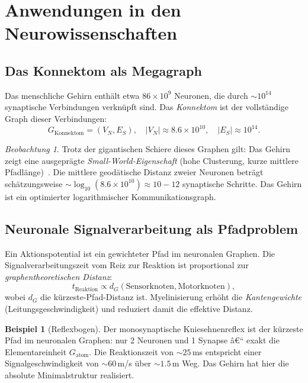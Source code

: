 ﻿\documentclass[12pt,a4paper,twoside]{article}
\theoremstyle{definition}
\newtheorem{beispiel}{Beispiel}[section]
\theoremstyle{plain}
\theoremstyle{remark}
\newtheorem{beobachtung}{Beobachtung}[section]
\begin{document}
\section{Anwendungen in den Neurowissenschaften}
\label{sec:neuro}

\subsection{Das Konnektom als Megagraph}

Das menschliche Gehirn enthält etwa $86 \times 10^9$ Neuronen,
die durch $\sim 10^{14}$ synaptische Verbindungen verknüpft
sind.  Das \emph{Konnektom} ist der vollständige Graph dieser
Verbindungen:
\[
  G_{\text{Konnektom}} = (V_N, E_S), \quad
  |V_N| \approx 8.6 \times 10^{10}, \quad
  |E_S| \approx 10^{14}.
\]

\begin{beobachtung}
Trotz der gigantischen Schiere dieses Graphen gilt:  Das Gehirn
zeigt eine ausgeprägte \emph{Small-World-Eigenschaft}
(hohe Clusterung, kurze mittlere Pfadlänge)~\cite{Watts1998}.
Die mittlere geodätische Distanz zweier Neuronen beträgt
schätzungsweise $\sim \log_{10}(8.6 \times 10^{10}) \approx 10{-}12$
synaptische Schritte.  Das Gehirn ist ein optimierter
logarithmischer Kommunikationsgraph.
\end{beobachtung}

\subsection{Neuronale Signalverarbeitung als Pfadproblem}

Ein Aktionspotential ist ein gewichteter Pfad im neuronalen
Graphen.  Die Signalverarbeitungszeit vom Reiz zur Reaktion ist
proportional zur \emph{graphentheoretischen Distanz}:
\[
  t_{\text{Reaktion}} \propto d_{G}(\text{Sensorknoten},
                                    \text{Motorknoten}),
\]
wobei $d_G$ die kürzeste-Pfad-Distanz ist.  Myelinisierung
erhöht die \emph{Kantengewichte} (Leitungsgeschwindigkeit)
und reduziert damit die effektive Distanz.

\begin{beispiel}[Reflexbogen]
Der monosynaptische Kniesehnenreflex ist der kürzeste Pfad
im neuronalen Graphen: nur 2 Neuronen und 1 Synapse â€“
exakt die Elementareinheit $G_{\text{atom}}$.  Die
Reaktionszeit von $\sim 25\,$ms entspricht einer
Signalgeschwindigkeit von $\sim 60\,$m/s über $\sim 1.5\,$m Weg.
Das Gehirn hat hier die absolute Minimalstruktur realisiert.
\end{beispiel}
\end{document}
